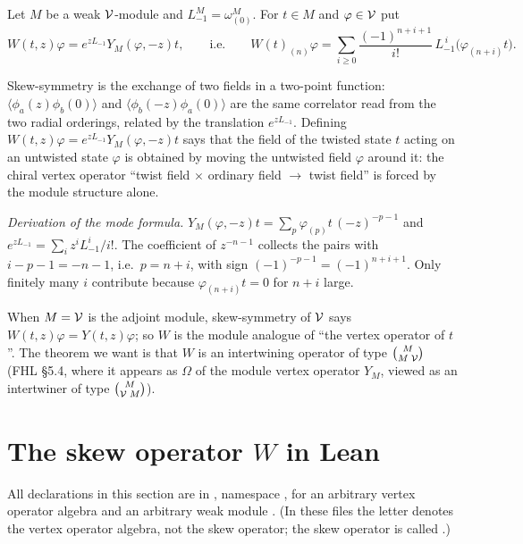 \begin{definition}\label{ch09:def:skew}
Let $M$ be a weak $\mathcal{V}$-module and $L_{-1}^M=\omega^M_{(0)}$. For $t\in M$ and
$\varphi\in\mathcal{V}$ put
\begin{equation}\label{ch09:eq:Wdef}
W(t,z)\varphi=e^{zL_{-1}}Y_M(\varphi,-z)t,\qquad\text{i.e.}\qquad
W(t)_{(n)}\varphi=\sum_{i\ge0}\frac{(-1)^{n+i+1}}{i!}\,L_{-1}^{\,i}\big(\varphi_{(n+i)}t\big).
\end{equation}
\end{definition}

\begin{physics}
Skew-symmetry is the exchange of two fields in a two-point function: $\langle\phi_a(z)\phi_b(0)\rangle$ and $\langle\phi_b(-z)\phi_a(0)\rangle$ are the same correlator read from the two radial orderings, related by the translation $e^{zL_{-1}}$. Defining $W(t,z)\varphi=e^{zL_{-1}}Y_M(\varphi,-z)t$ says that the field of the twisted state $t$ acting on an untwisted state $\varphi$ is obtained by moving the untwisted field $\varphi$ around it: the chiral vertex operator ``twist field $\times$ ordinary field $\to$ twist field'' is forced by the module structure alone.
\end{physics}

\noindent\emph{Derivation of the mode formula.} $Y_M(\varphi,-z)t=\sum_p\varphi_{(p)}t\,(-z)^{-p-1}$
and $e^{zL_{-1}}=\sum_i z^iL_{-1}^i/i!$. The coefficient of $z^{-n-1}$ collects the pairs with
$i-p-1=-n-1$, i.e.\ $p=n+i$, with sign $(-1)^{-p-1}=(-1)^{n+i+1}$. Only finitely many $i$
contribute because $\varphi_{(n+i)}t=0$ for $n+i$ large.

When $M=\mathcal{V}$ is the adjoint module, skew-symmetry of $\mathcal{V}$ says $W(t,z)\varphi=Y(t,z)\varphi$;
so $W$ is the module analogue of ``the vertex operator of $t$''. The theorem we want is that
$W$ is an intertwining operator of type $\binom{M}{M\;\mathcal{V}}$ (FHL \S5.4, where it appears
as $\Omega$ of the module vertex operator $Y_M$, viewed as an intertwiner of type
$\binom{M}{\mathcal{V}\;M}$).

\section{The skew operator \texorpdfstring{$W$}{W} in Lean}\label{ch09:sec:W}

All declarations in this section are in ,
namespace , for an arbitrary vertex operator algebra
 and an arbitrary weak module .
(In these files the letter  denotes the vertex operator algebra, not the skew operator;
the skew operator is called .)

